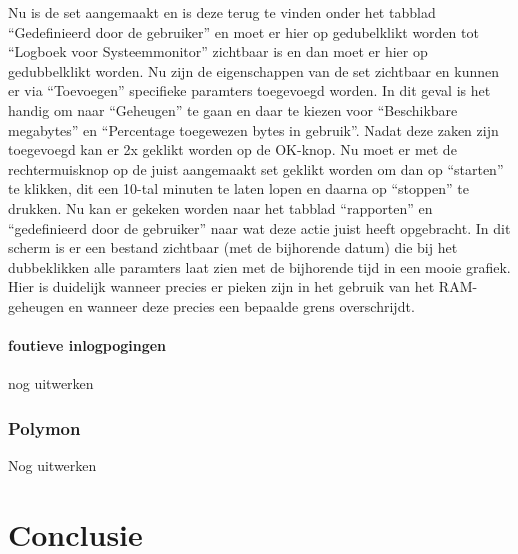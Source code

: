 \documentclass[pdftex,a4paper,12pt]{report}
\begin{document}
Nu is de set aangemaakt en is deze terug te vinden onder het tabblad "`Gedefinieerd door de gebruiker"' en moet er hier op gedubelklikt worden tot "`Logboek voor Systeemmonitor"' zichtbaar is en dan moet er hier op gedubbelklikt worden. Nu zijn de eigenschappen van de set zichtbaar en kunnen er via "`Toevoegen"' specifieke paramters toegevoegd worden. In dit geval is het handig om naar "`Geheugen"' te gaan en daar te kiezen voor "`Beschikbare megabytes"' en "`Percentage toegewezen bytes in gebruik"'.	Nadat deze zaken zijn toegevoegd kan er 2x geklikt worden op de OK-knop. Nu moet er met de rechtermuisknop op de juist aangemaakt set geklikt worden om dan op "`starten"' te klikken, dit een 10-tal minuten te laten lopen en daarna op "`stoppen"' te drukken. Nu kan er gekeken worden naar het tabblad "`rapporten"' en "`gedefinieerd door de gebruiker"' naar wat deze actie juist heeft opgebracht. In dit scherm is er een bestand zichtbaar (met de bijhorende datum) die bij het dubbeklikken alle paramters laat zien met de bijhorende tijd in een mooie grafiek. Hier is duidelijk wanneer precies er pieken zijn in het gebruik van het RAM-geheugen en wanneer deze precies een bepaalde grens overschrijdt.

\subsubsection{foutieve inlogpogingen}
nog uitwerken

\subsection{Polymon}
Nog uitwerken


\chapter{Conclusie}
\label{ch:conclusie}








\listoffigures
\listoftables
\end{document}
